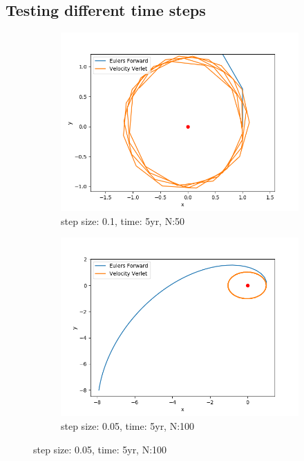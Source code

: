 \documentclass{article}
\begin{document}
\subsection*{Testing different time steps}
\begin{figure}[H]
  \centering
      \begin{subfigure}{0.5\textwidth}
    \centering
    \includegraphics[width=1.0\textwidth]{plots/compare_h1.png}
    \caption{step size: 0.1, time: 5yr, N:50}
  \end{subfigure}%
  \begin{subfigure}{0.5\textwidth}
    \centering
    \includegraphics[width=1.0\textwidth]{plots/compare_h05.png}
    \caption{step size: 0.05, time: 5yr, N:100}
  \end{subfigure}
\end{figure}
\end{document}
